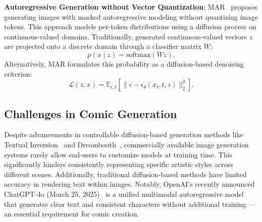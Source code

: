 \textbf{Autoregressive Generation without Vector Quantization}: MAR~\cite{li2024autoregressive} proposes generating images
with masked autoregressive modeling without quantizing image tokens.
This approach models per-token distributions using a diffusion process on continuous-valued domains.
Traditionally, generated continuous-valued vectors $z$ are projected onto a discrete domain through a classifier matrix $W$:
\begin{equation}
    p(x \mid z) = \text{softmax}(W z).
    \label{eq:softmax-projection}
\end{equation}
Alternatively, MAR formulates this probability as a diffusion-based denoising criterion:
\begin{equation}
    \mathcal{L}(z, x) = \mathbb{E}_{\epsilon, t}[\|\epsilon - \epsilon_\theta(x_t, t, z)\|_2^2].
    \label{eq:mar-loss}
\end{equation}

\subsection{Challenges in Comic Generation}\label{subsec:challenges-in-comic-generation}

Despite advancements in controllable diffusion-based generation methods like Textual Inversion~\cite{gal2022image}
and Dreambooth~\cite{ruiz2023dreambooth}, commercially available image generation systems rarely allow end-users
to customize models at training time.
This significantly hinders consistently representing specific artistic styles across different scenes.
Additionally, traditional diffusion-based methods have limited accuracy in rendering text within images.
Notably, OpenAI's recently announced ChatGPT-4o (March 25, 2025)~\cite{openai2025introducing} is
a unified multimodal autoregressive model that generates clear text and consistent characters
without additional training --- an essential requirement for comic creation.
